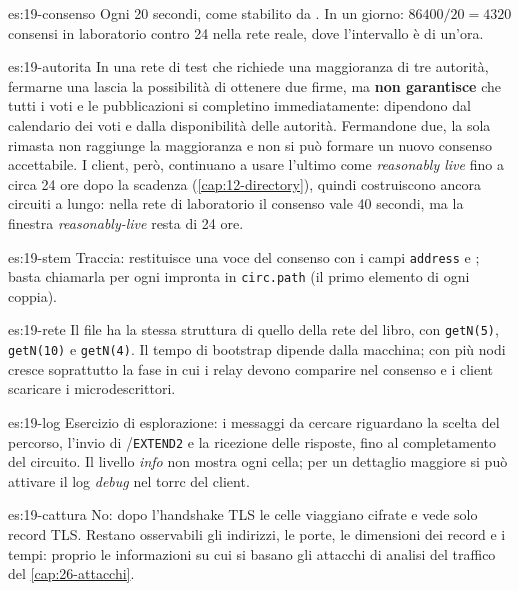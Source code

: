 \begin{soluzione}{es:19-consenso}
Ogni 20 secondi, come stabilito da . In un giorno: $86400/20 = 4320$ consensi in laboratorio contro 24 nella rete reale, dove l'intervallo è di un'ora.
\end{soluzione}

\begin{soluzione}{es:19-autorita}
In una rete di test che richiede una maggioranza di tre autorità, fermarne una lascia la possibilità di ottenere due firme, ma \textbf{non garantisce} che tutti i voti e le pubblicazioni si completino immediatamente: dipendono dal calendario dei voti e dalla disponibilità delle autorità. Fermandone due, la sola rimasta non raggiunge la maggioranza e non si può formare un nuovo consenso accettabile. I client, però, continuano a usare l'ultimo come \emph{reasonably live} fino a circa 24 ore dopo la scadenza (\cref{cap:12-directory}), quindi costruiscono ancora circuiti a lungo: nella rete di laboratorio il consenso vale 40 secondi, ma la finestra \emph{reasonably-live} resta di 24 ore.
\end{soluzione}

\begin{soluzione}{es:19-stem}
Traccia:  restituisce una voce del consenso con i campi \texttt{address} e ; basta chiamarla per ogni impronta in \texttt{circ.path} (il primo elemento di ogni coppia).
\end{soluzione}

\begin{soluzione}{es:19-rete}
Il file ha la stessa struttura di quello della rete del libro, con \texttt{getN(5)}, \texttt{getN(10)} e \texttt{getN(4)}. Il tempo di bootstrap dipende dalla macchina; con più nodi cresce soprattutto la fase in cui i relay devono comparire nel consenso e i client scaricare i microdescrittori.
\end{soluzione}

\begin{soluzione}{es:19-log}
Esercizio di esplorazione: i messaggi da cercare riguardano la scelta del percorso, l'invio di /\texttt{EXTEND2} e la ricezione delle risposte, fino al completamento del circuito. Il livello \emph{info} non mostra ogni cella; per un dettaglio maggiore si può attivare il log \emph{debug} nel torrc del client.
\end{soluzione}

\begin{soluzione}{es:19-cattura}
No: dopo l'handshake TLS le celle viaggiano cifrate e  vede solo record TLS. Restano osservabili gli indirizzi, le porte, le dimensioni dei record e i tempi: proprio le informazioni su cui si basano gli attacchi di analisi del traffico del \cref{cap:26-attacchi}.
\end{soluzione}
